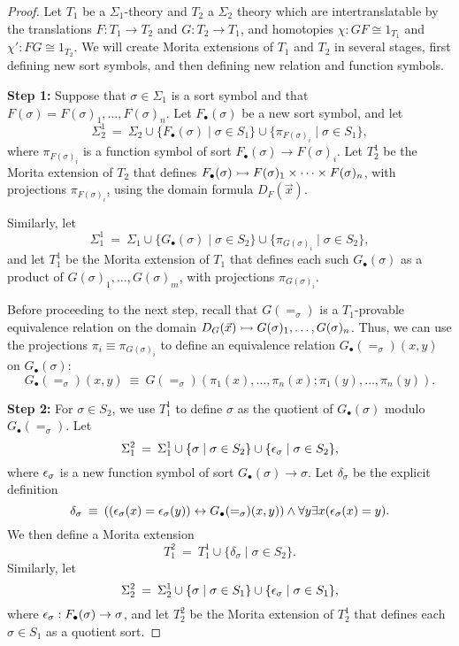 \begin{proof} Let $T_1$ be a $\Sigma _1$-theory and $T_2$ a
  $\Sigma _2$ theory which are intertranslatable by the translations
  $F:T_1\to T_2$ and $G:T_2\to T_1$, and homotopies
  $\chi :GF\cong 1_{T_1}$ and $\chi ':FG\cong 1_{T_2}$.  We will
  create Morita extensions of $T_1$ and $T_2$ in several stages, first
  defining new sort symbols, and then defining new relation and
  function symbols.

  \bigskip \textbf{Step 1:} Suppose that $\sigma\in\Sigma _1$ is a
  sort symbol and that $F(\sigma )=F(\sigma )_1,\dots ,F(\sigma )_n$.
  Let $F_\bullet (\sigma )$ be a new sort symbol, and let
  \[ \Sigma _2^1\:=\:\Sigma _2\cup \{ F_\bullet (\sigma ) \mid \sigma
    \in S_1 \}\cup \{ \pi _{F(\sigma )_i} \mid \sigma \in S_1 \} , \]
  where $\pi _{F(\sigma )_i}$ is a function symbol of sort
  $F_\bullet (\sigma )\to F(\sigma )_i$.  Let $T_2^1$ be the Morita
  extension of $T_2$ that defines
  $F _\bullet (\sigma )\rightarrowtail F(\sigma )_1\times\cdots\times F(\sigma
  )_n$, with projections $\pi _{F(\sigma )_i}$, using the domain
  formula $D_F (\vec{x})$.

  Similarly, let
  \[ \Sigma _1^1\:=\:\Sigma _1\cup \{ G_\bullet (\sigma )\mid\sigma
    \in S_2 \} \cup \{ \pi _{G(\sigma )_i}\mid\sigma \in S_2 \} ,\]
  and let $T_1^1$ be the Morita extension of $T_1$ that defines each
  such $G_\bullet (\sigma )$ as a product of
  $G(\sigma )_1,\dots ,G(\sigma )_m$, with projections
  $\pi _{G(\sigma )_i}$.

  Before proceeding to the next step, recall that $G(= _\sigma )$ is a
  $T_1$-provable equivalence relation on the domain
  $D_G(\vec{x})\rightarrowtail G(\sigma )_1,\dots ,G(\sigma )_n$.  Thus, we can
  use the projections $\pi _i\equiv \pi _{G(\sigma )_i}$ to define an
  equivalence relation $G_\bullet (=_\sigma )(x,y)$ on
  $G_\bullet (\sigma )$:
  \[ G_\bullet (=_\sigma )(x,y)\: \equiv \: G(=_\sigma )\left( \pi
      _1(x),\dots ,\pi _n(x);\pi _1(y),\dots ,\pi _n(y)\right ) .\]

  \bigskip \textbf{Step 2:} For $\sigma\in S_2$, we use $T_1^1$ to
  define $\sigma$ as the quotient of $G_\bullet (\sigma )$ modulo
  $G_\bullet (=_\sigma)$.  Let
  \[ \Sigma _1^2 \:=\: \Sigma _1^1\cup \{ \sigma \mid \sigma \in S_2
    \} \cup \{ \epsilon _\sigma \mid \sigma \in S_2\} ,\] where
  $\epsilon _\sigma$ is a new function symbol of sort
  $G_\bullet (\sigma )\to \sigma$.  Let $\delta _\sigma$ be the
  explicit definition
  \begin{equation} \delta _\sigma \:\equiv \: ((\epsilon _\sigma (x)=\epsilon
    _\sigma (y))\leftrightarrow G_\bullet (=_\sigma )(x,y))\wedge
    \forall y\exists x(\epsilon _\sigma (x)=y) . \label{ex1} \end{equation}
  We then define a Morita extension
  \[ T_1^2 \: = \: T_1^1\cup \{ \delta _\sigma \mid \sigma \in S_2 \}
    .\] Similarly, let
  \[ \Sigma _2^2 \: = \: \Sigma _2^1\cup \{ \sigma \mid \sigma \in S_1
    \}\cup \{ \epsilon _\sigma \mid \sigma \in S_1 \} ,\] where
  $\epsilon _\sigma :F_\bullet (\sigma )\to \sigma$, and let $T_2^2$ be the
  Morita extension of $T_2^1$ that defines each $\sigma\in S_1$ as a
  quotient sort.


\end{proof}
